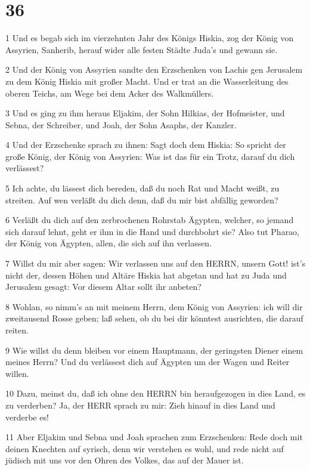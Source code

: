 \chapter{36}

\par 1 Und es begab sich im vierzehnten Jahr des Königs Hiskia, zog der König von Assyrien, Sanherib, herauf wider alle festen Städte Juda's und gewann sie.
\par 2 Und der König von Assyrien sandte den Erzschenken von Lachis gen Jerusalem zu dem König Hiskia mit großer Macht. Und er trat an die Wasserleitung des oberen Teichs, am Wege bei dem Acker des Walkmüllers.
\par 3 Und es ging zu ihm heraus Eljakim, der Sohn Hilkias, der Hofmeister, und Sebna, der Schreiber, und Joah, der Sohn Asaphs, der Kanzler.
\par 4 Und der Erzschenke sprach zu ihnen: Sagt doch dem Hiskia: So spricht der große König, der König von Assyrien: Was ist das für ein Trotz, darauf du dich verlässest?
\par 5 Ich achte, du lässest dich bereden, daß du noch Rat und Macht weißt, zu streiten. Auf wen verläßt du dich denn, daß du mir bist abfällig geworden?
\par 6 Verläßt du dich auf den zerbrochenen Rohrstab Ägypten, welcher, so jemand sich darauf lehnt, geht er ihm in die Hand und durchbohrt sie? Also tut Pharao, der König von Ägypten, allen, die sich auf ihn verlassen.
\par 7 Willst du mir aber sagen: Wir verlassen uns auf den HERRN, unsern Gott! ist's nicht der, dessen Höhen und Altäre Hiskia hat abgetan und hat zu Juda und Jerusalem gesagt: Vor diesem Altar sollt ihr anbeten?
\par 8 Wohlan, so nimm's an mit meinem Herrn, dem König von Assyrien: ich will dir zweitausend Rosse geben; laß sehen, ob du bei dir könntest ausrichten, die darauf reiten.
\par 9 Wie willst du denn bleiben vor einem Hauptmann, der geringsten Diener einem meines Herrn? Und du verlässest dich auf Ägypten um der Wagen und Reiter willen.
\par 10 Dazu, meinst du, daß ich ohne den HERRN bin heraufgezogen in dies Land, es zu verderben? Ja, der HERR sprach zu mir: Zieh hinauf in dies Land und verderbe es!
\par 11 Aber Eljakim und Sebna und Joah sprachen zum Erzschenken: Rede doch mit deinen Knechten auf syrisch, denn wir verstehen es wohl, und rede nicht auf jüdisch mit uns vor den Ohren des Volkes, das auf der Mauer ist.
